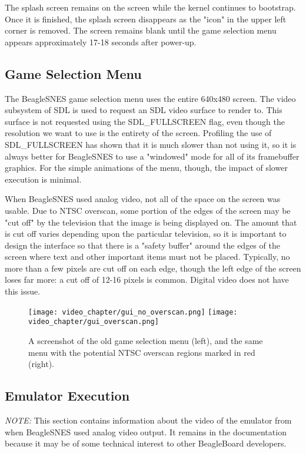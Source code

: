 The splash screen remains on the screen while the kernel continues to bootstrap.  Once it is finished, the splash screen disappears as the "icon" in the upper left corner is removed.  The screen remains blank until the game selection menu appears approximately 17-18 seconds after power-up.
 
\subsection{Game Selection Menu}

The BeagleSNES game selection menu uses the entire 640x480 screen. The video subsystem of SDL is used to request an SDL video surface to render to.  This surface is not requested using the SDL\_FULLSCREEN flag, even though the resolution we want to use is the entirety of the screen.  Profiling the use of SDL\_FULLSCREEN has shown that it is much slower than not using it, so it is always better for BeagleSNES to use a "windowed" mode for all of its framebuffer graphics.  For the simple animations of the menu, though, the impact of slower execution is minimal.

When BeagleSNES used analog video, not all of the space on the screen was usable. Due to NTSC overscan, some portion of the edges of the screen may be "cut off" by the television that the image is being displayed on. The amount that is cut off varies depending upon the particular television, so it is important to design the interface so that there is a "safety buffer" around the edges of the screen where text and other important items must not be placed.  Typically, no more than a few pixels are cut off on each edge, though the left edge of the screen loses far more: a cut off of 12-16 pixels is common.  Digital video does not have this issue.

\begin{figure}[h]
\centering\texttt{[image: video\_chapter/gui\_no\_overscan.png]} \texttt{[image: video\_chapter/gui\_overscan.png]}
\caption{A screenshot of the old game selection menu (left), and the same menu with the potential NTSC overscan regions marked in red (right).}
\end{figure}

\subsection{Emulator Execution}

\emph{NOTE:} This section contains information about the video of the emulator from when BeagleSNES used analog video output.  It remains in the documentation because it may be of some technical interest to other BeagleBoard developers.

